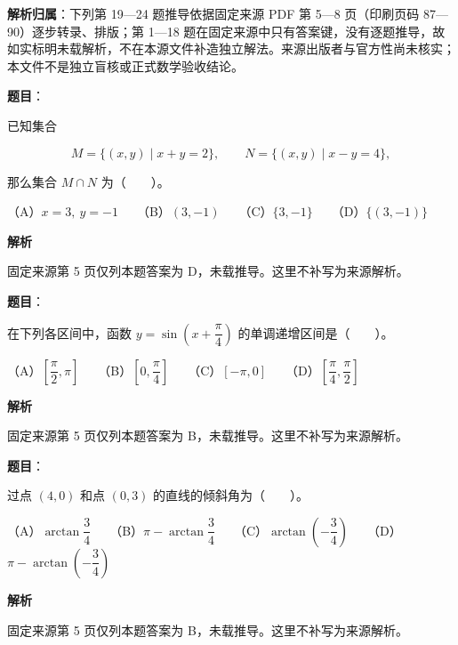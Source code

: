 

\begin{gknotice}
\textbf{解析归属}：下列第 19—24 题推导依据固定来源 PDF 第 5—8 页（印刷页码 87—90）逐步转录、排版；第 1—18 题在固定来源中只有答案键，没有逐题推导，故如实标明未载解析，不在本源文件补造独立解法。来源出版者与官方性尚未核实；本文件不是独立盲核或正式数学验收结论。
\end{gknotice}

\begin{answer}

\textbf{题目}：

已知集合

\nopagebreak[4]
\[
M=\{(x,y)\mid x+y=2\},\qquad N=\{(x,y)\mid x-y=4\},
\]

那么集合 $M\cap N$ 为\mbox{（　　）}。

（A）$x=3,\ y=-1$　　（B）$(3,-1)$　　（C）$\{3,-1\}$　　（D）$\{(3,-1)\}$

\textbf{解析}

固定来源第 5 页仅列本题答案为 D，未载推导。这里不补写为来源解析。


\end{answer}
\begin{answer}

\textbf{题目}：

在下列各区间中，函数 $y=\sin\left(x+\dfrac{\pi}{4}\right)$ 的单调递增区间是\mbox{（　　）}。

（A）$\left[\dfrac{\pi}{2},\pi\right]$　　（B）$\left[0,\dfrac{\pi}{4}\right]$　　（C）$[-\pi,0]$　　（D）$\left[\dfrac{\pi}{4},\dfrac{\pi}{2}\right]$

\textbf{解析}

固定来源第 5 页仅列本题答案为 B，未载推导。这里不补写为来源解析。


\end{answer}
\begin{answer}

\textbf{题目}：

过点 $(4,0)$ 和点 $(0,3)$ 的直线的倾斜角为\mbox{（　　）}。

（A）$\arctan\dfrac{3}{4}$　　（B）$\pi-\arctan\dfrac{3}{4}$　　（C）$\arctan\left(-\dfrac{3}{4}\right)$　　（D）$\pi-\arctan\left(-\dfrac{3}{4}\right)$

\textbf{解析}

固定来源第 5 页仅列本题答案为 B，未载推导。这里不补写为来源解析。


\end{answer}
